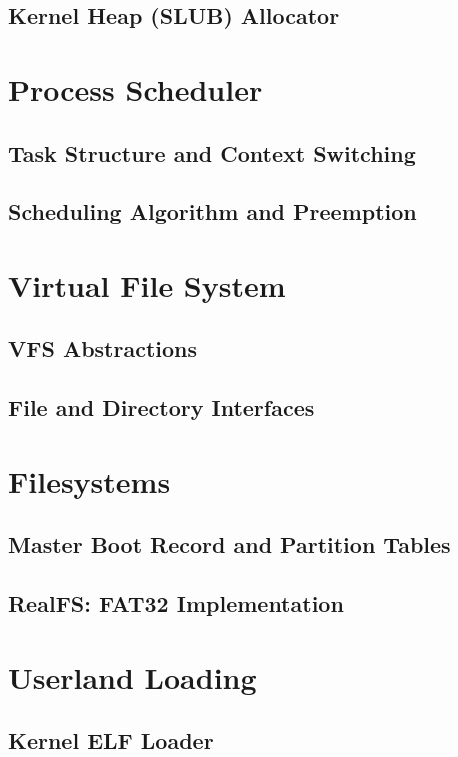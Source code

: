 \documentclass[12pt,a4paper]{report}
\begin{document}
	\section{Kernel Heap (SLUB) Allocator}
	
	\chapter{Process Scheduler}
	\section{Task Structure and Context Switching}
	
	\section{Scheduling Algorithm and Preemption}
	
	\chapter{Virtual File System}
	\section{VFS Abstractions}
	
	\section{File and Directory Interfaces}
	
	\chapter{Filesystems}
	\section{Master Boot Record and Partition Tables}
	
	\section{RealFS: FAT32 Implementation}
	
	\chapter{Userland Loading}
	\section{Kernel ELF Loader}
	
\end{document}
